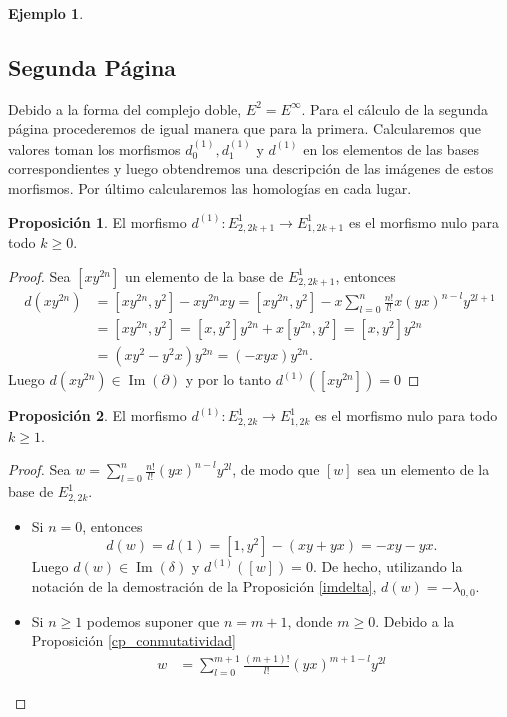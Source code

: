 \documentclass[a4paper,oneside,fleqn,11pt]{report}
\theoremstyle{definition}
\theoremstyle{definition}
\newtheorem{example}{Ejemplo}[section]
\newtheorem{prop}{Proposición}
\numberwithin{prop}{subsection}
\DeclareMathOperator\Ima{Im}
\begin{document}
\begin{example}
\subsection{Segunda Página}
Debido a la forma del complejo doble, $E^2 = E^{\infty}$. Para el cálculo de la segunda página procederemos de igual manera que para la primera. Calcularemos
que valores toman los morfismos $d_0^{(1)}, d_1^{(1)}$ y $d^{(1)}$ en los elementos de las bases correspondientes y luego obtendremos una descripción
de las imágenes de estos morfismos. Por último calcularemos las homologías en cada lugar.
\begin{prop} El morfismo $d^{(1)}: E_{2, 2k + 1}^1 \to E_{1, 2k + 1}^1$ es el morfismo nulo para todo $k \geq 0$.
\end{prop}
\begin{proof}
	Sea $\left[xy^{2n}\right]$ un elemento de la base de $E_{2, 2k + 1}^1$, entonces
	\begin{align*}
		d(xy^{2n}) &= \left[ xy^{2n}, y^2 \right] - xy^{2n}xy
			= \left[ xy^{2n}, y^2 \right] - x\sum_{l = 0}^n\frac{n!}{l!}x(yx)^{n - l}y^{2l + 1}  \\
		&= \left[ xy^{2n}, y^2 \right] = \left[x, y^2 \right]y^{2n} + x\left[y^{2n}, y^2\right] =  \left[x, y^2 \right]y^{2n} \\
		&= (xy^2 - y^2x)y^{2n} = (-xyx)y^{2n}. 
	\end{align*}
	Luego $d(xy^{2n}) \in \Ima(\partial)$ y por lo tanto $d^{(1)}(\left[xy^{2n}\right]) = 0$
	\end{proof}
\begin{prop} El morfismo $d^{(1)}: E_{2, 2k}^1 \to E_{1, 2k}^1$ es el morfismo nulo para todo $k \geq 1$.
\end{prop}
\begin{proof}
	Sea $w = \sum_{l = 0}^n \frac{n!}{l!}(yx)^{n - l}y^{2l}$, de modo que $[w]$ sea un elemento de la base de $E_{2,2k}^1$.
	\begin{itemize}
		\item Si $n = 0$, entonces
			\[
				d(w) = d(1) = \left[1, y^2 \right] - (xy + yx) = -xy -yx.			
			\]
			Luego $d(w) \in \Ima(\delta)$ y $d^{(1)}(\left[w\right]) = 0$. De hecho, utilizando la notación de la demostración de la Proposición \ref{imdelta},
			$d(w) = -\lambda_{0,0}$.
		\item Si $n \geq 1$ podemos suponer que $n = m + 1$, donde $m \geq 0$. Debido a la Proposición \ref{cp_conmutatividad}
			\begin{align*}
				w &= \sum_{l = 0}^{m + 1} \frac{(m + 1)!}{l!}(yx)^{m + 1 - l}y^{2l}

\end{align*}
\end{itemize}
\end{proof}
\end{example}
\end{document}
